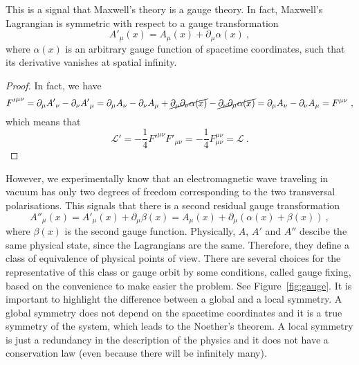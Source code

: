     This is a signal that Maxwell's theory is a gauge theory. In fact, Maxwell's Lagrangian is symmetric with respect to a gauge transformation  
    \begin{equation*}
        {A'}_\mu (x) = A_\mu (x) + \partial_\mu \alpha (x) ~,
    \end{equation*}
    where $\alpha (x)$ is an arbitrary gauge function of spacetime coordinates, such that its derivative vanishes at spatial infinity.
    \begin{proof}
        In fact, we have
        \begin{equation*}
            {F'}^{\mu\nu} = \partial_\mu {A'}_\nu - \partial_\nu {A'}_\mu = \partial_\mu A_\nu - \partial_\nu A_\mu + \cancel{\partial_\mu \partial_\nu \alpha(x)} - \cancel{\partial_\nu \partial_\mu \alpha(x)} = \partial_\mu A_\nu - \partial_\nu A_\mu = F^{\mu\nu} ~,
        \end{equation*}
        which means that
        \begin{equation*}
            \mathcal L' = - \frac{1}{4} {F'}^{\mu\nu} F'_{\mu\nu} = - \frac{1}{4} F^{\mu\nu}_{\mu\nu} = \mathcal L ~.
        \end{equation*}
    \end{proof}

    However, we experimentally know that an electromagnetic wave traveling in vacuum has only two degrees of freedom corresponding to the two transversal polarisations. This signals that there is a second residual gauge transformation 
    \begin{equation*}
        {A''}_\mu (x) = {A'}_\mu (x) + \partial_\mu \beta (x) = A_\mu (x) + \partial_\mu (\alpha (x) + \beta (x) ) ~,
    \end{equation*}
    where $\beta (x)$ is the second gauge function. Physically, $A$, $A'$ and $A''$ descibe the same physical state, since the Lagrangians are the same. Therefore, they define a class of equivalence of physical points of view. There are several choices for the representative of this class or gauge orbit by some conditions, called gauge fixing, based on the convenience to make easier the problem. See Figure~\ref{fig:gauge}. It is important to highlight the difference between a global and a local symmetry. A global symmetry does not depend on the spacetime coordinates and it is a true symmetry of the system, which leads to the Noether's theorem. A local symmetry is just a redundancy in the description of the physics and it does not have a conservation law (even because there will be infinitely many).

